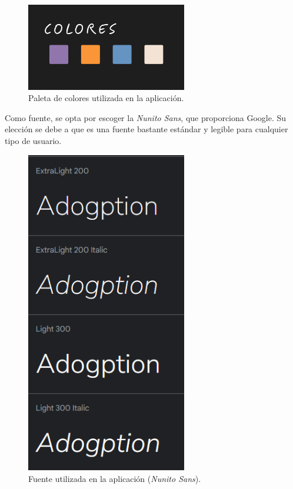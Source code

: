 \documentclass[a4paper, 12pt]{article}
\begin{document}
\begin{figure}[H]
	\begin{center}
		{\includegraphics[width=7cm]{design/Colors.jpg}\par}
		\caption{Paleta de colores utilizada en la aplicación.}
	\end{center}
\end{figure}

Como fuente, se opta por escoger la \textit{Nunito Sans}, que proporciona Google. Su elección se debe a que es una fuente bastante estándar y legible para cualquier tipo de usuario.

\begin{figure}[H]
	\begin{center}
		{\includegraphics[width=7cm]{design/NunitoFont.png}\par}
		\caption{Fuente utilizada en la aplicación (\textit{Nunito Sans}).}
	\end{center}
\end{figure}
\end{document}
